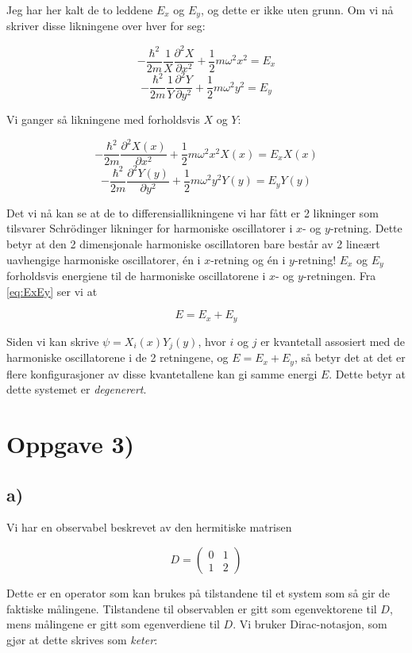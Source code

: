 \documentclass[a4paper,norsk, 10pt]{article}
\numberwithin{equation}{section}
\begin{document}
Jeg har her kalt de to leddene $E_x$ og $E_y$, og dette er ikke uten grunn. Om vi nå skriver disse likningene over hver for seg:

$$
-\frac{\hbar^2}{2m}\frac{1}{X}\frac{\partial^2 X}{\partial x^2} + \frac{1}{2}m\omega^2x^2 = E_x
$$
$$
-\frac{\hbar^2}{2m}\frac{1}{Y}\frac{\partial^2 Y}{\partial y^2} + \frac{1}{2}m\omega^2y^2 = E_y
$$

Vi ganger så likningene med forholdsvis $X$ og $Y$:

$$
-\frac{\hbar^2}{2m}\frac{\partial^2 X(x)}{\partial x^2} + \frac{1}{2}m\omega^2x^2X(x) = E_xX(x)
$$
$$
-\frac{\hbar^2}{2m}\frac{\partial^2 Y(y)}{\partial y^2} + \frac{1}{2}m\omega^2y^2Y(y) = E_yY(y)
$$

Det vi nå kan se at de to differensiallikningene vi har fått er 2 likninger som tilsvarer Schrödinger likninger for harmoniske oscillatorer i $x$- og $y$-retning. Dette betyr at den 2 dimensjonale harmoniske oscillatoren bare består av 2 lineært uavhengige harmoniske oscillatorer, én i $x$-retning og én i $y$-retning! $E_x$ og $E_y$ forholdsvis energiene til de harmoniske oscillatorene i $x$- og $y$-retningen. Fra \eqref{eq:ExEy} ser vi at

$$
E = E_x +E_y
$$

Siden vi kan skrive $\psi = X_i(x)Y_j(y)$, hvor $i$ og $j$ er kvantetall assosiert med de harmoniske oscillatorene i de 2 retningene, og $E = E_x + E_y$, så betyr det at det er flere konfigurasjoner av disse kvantetallene kan gi samme energi $E$. Dette betyr at dette systemet er \textit{degenerert}.

\newpage

\section{Oppgave 3)}

\subsection*{a)}
Vi har en observabel beskrevet av den hermitiske matrisen

\begin{equation}
D =
\begin{pmatrix}
0 &1\\
1 &2
\end{pmatrix}
\end{equation}

Dette er en operator som kan brukes på tilstandene til et system som så gir de faktiske målingene. Tilstandene til observablen er gitt som egenvektorene til $D$, mens målingene er gitt som egenverdiene til $D$. Vi bruker Dirac-notasjon, som gjør at dette skrives  som \textit{keter}:
\end{document}
